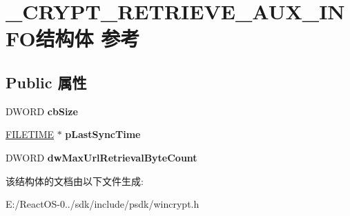 \hypertarget{struct___c_r_y_p_t___r_e_t_r_i_e_v_e___a_u_x___i_n_f_o}{}\section{\+\_\+\+C\+R\+Y\+P\+T\+\_\+\+R\+E\+T\+R\+I\+E\+V\+E\+\_\+\+A\+U\+X\+\_\+\+I\+N\+F\+O结构体 参考}
\label{struct___c_r_y_p_t___r_e_t_r_i_e_v_e___a_u_x___i_n_f_o}
\subsection*{Public 属性}
\begin{DoxyCompactItemize}
\item 
\mbox{\label{struct___c_r_y_p_t___r_e_t_r_i_e_v_e___a_u_x___i_n_f_o_a882b4f53e0bd38fca16f07ba4226e6aa}} 
D\+W\+O\+RD {\bfseries cb\+Size}
\item 
\mbox{\label{struct___c_r_y_p_t___r_e_t_r_i_e_v_e___a_u_x___i_n_f_o_a1e133b88fc7d835390266e694c7e3a66}} 
\hyperlink{struct___f_i_l_e_t_i_m_e}{F\+I\+L\+E\+T\+I\+ME} $\ast$ {\bfseries p\+Last\+Sync\+Time}
\item 
\mbox{\label{struct___c_r_y_p_t___r_e_t_r_i_e_v_e___a_u_x___i_n_f_o_a1689dd0e31ce751d32da929154dc532d}} 
D\+W\+O\+RD {\bfseries dw\+Max\+Url\+Retrieval\+Byte\+Count}
\end{DoxyCompactItemize}


该结构体的文档由以下文件生成\+:\begin{DoxyCompactItemize}
\item 
E\+:/\+React\+O\+S-\/0../sdk/include/psdk/wincrypt.\+h\end{DoxyCompactItemize}
